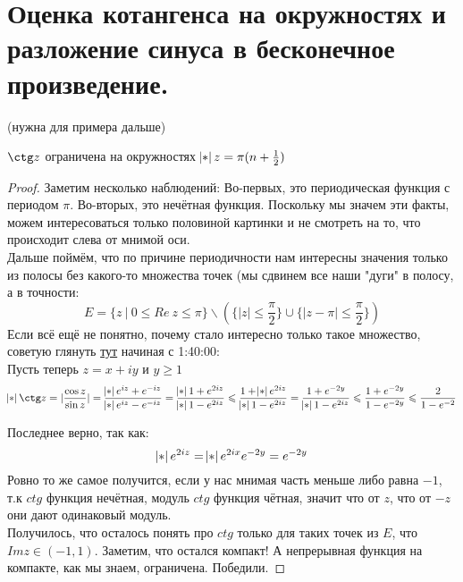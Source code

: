 \section{Оценка котангенса на окружностях и разложение синуса в бесконечное произведение.}

\begin{lemma} (нужна для примера дальше)

    $\ctg z$ ограничена на окружностях $\abs{z} = \pi(n + \frac{1}{2})$

\end{lemma}

\begin{proof}

    Заметим несколько наблюдений:
    Во-первых, это периодическая функция с периодом $\pi$. Во-вторых, это нечётная функция. Поскольку мы значем эти факты, можем интересоваться только половиной картинки и не смотреть на то, что происходит слева от мнимой оси.\\
    Дальше поймём, что по причине периодичности нам интересны значения только из полосы без какого-то множества точек (мы сдвинем все наши "дуги" в полосу, а в точности: $$E = \{z \ |\  0 \le Re \ z \le \pi\} \backslash (\{|z| \le \frac{\pi}{2}\} \cup \{|z - \pi| \le \frac{\pi}{2}\})$$
    Если всё ещё не понятно, почему стало интересно только такое множество, советую глянуть \href{https://www.youtube.com/watch?v=jVBB__949vo}{тут} начиная с 1:40:00:\\
    Пусть теперь $z = x + iy$ и $y \geq 1$
    \[
        \abs{\ctg z} = |\frac{\cos{z}}{\sin{z}}| =\frac{\abs{e^{iz} + e^{-iz}}}{\abs{e^{iz}-e^{-iz}}}
        = \frac{\abs{1+e^{2iz}}}{\abs{1-e^{2iz}}}
        \le \frac{1+\abs{e^{2iz}}}{\abs{1-e^{2iz}}}
        = \frac{1+e^{-2y}}{\abs{1-e^{2iz}}}
        \le \frac{1+e^{-2y}}{1-e^{-2y}}
        \le \frac{2}{1 - e^{-2}}
    \]
    
    Последнее верно, так как:
    \[
    \abs{e^{2 i z}} = \abs{e^{2ix}e^{-2y}} = e^{-2y}
    \]
    Ровно то же самое получится, если у нас мнимая часть меньше либо равна $-1$, т.к $ctg$ функция нечётная, модуль $ctg$ функция чётная, значит что от $z$, что от $-z$ они дают одинаковый модуль.\\
    Получилось, что осталось понять про $ctg$ только для таких точек из $E$, что $Im z \in (-1, 1)$. Заметим, что остался компакт! А непрерывная функция на компакте, как мы знаем, ограничена. Победили. 
\end{proof}

